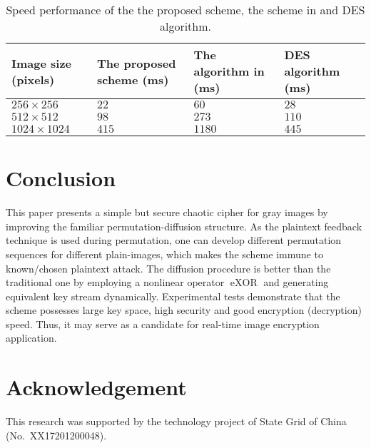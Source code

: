 \documentclass[3p,preprint,11pt]{elsarticle}
\DeclareMathOperator{\eXOR}{eXOR}
\begin{document}
\begin{table}[!htb]
\centering
\caption{Speed performance of the the proposed scheme, the scheme in \cite{Chen:3DChaoticCipher:CSF04} and
DES algorithm.}
\begin{tabular}{ p{2cm}  p{3.6cm}  p{3cm}  p{3.4cm} }
\hline  {Image size (pixels)} &{The proposed scheme (ms)}    &{The  algorithm in \cite{Chen:3DChaoticCipher:CSF04} (ms)}
                                                            &{DES algorithm (ms)}\\
\hline      $256\times 256$     & $22$     & $60$           & $28$                \\
\hline      $512\times 512$     & $98$     & $273$          & $110$                \\
\hline      $1024\times 1024$   & $415$    & $1180$         & $445$               \\
\hline
\end{tabular}
\label{tab:runspeed}
\end{table}


\section{Conclusion}
This paper presents a simple but secure chaotic cipher for gray images by
improving the familiar permutation-diffusion structure.
As the plaintext feedback technique is used during permutation, one can develop different permutation
sequences for different plain-images, which makes the scheme immune to known/chosen plaintext attack.
The diffusion procedure is better than the traditional one by employing a nonlinear
operator $\eXOR$ and generating equivalent key stream dynamically.
Experimental tests demonstrate that the scheme possesses large key space, high security
and good encryption (decryption) speed. Thus, it may serve as a candidate for real-time image encryption application.

\section*{Acknowledgement}
This research was supported by the technology project of State Grid of China (No.~XX17201200048).



\end{document}
